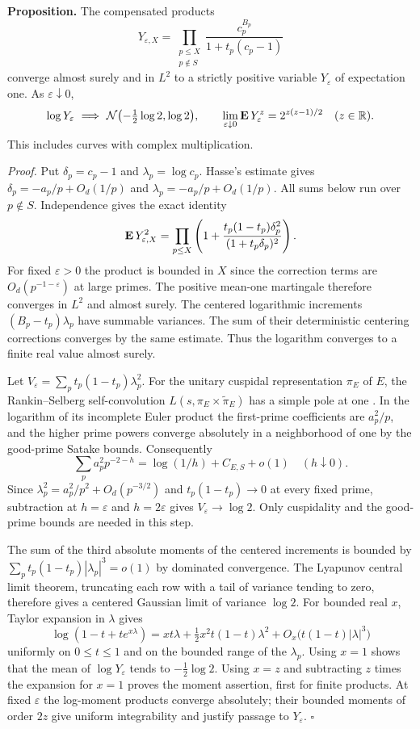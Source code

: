 \documentclass[11pt]{article}
\begin{document}
\medskip\noindent\textbf{Proposition.}
The compensated products
\[
 Y_{\varepsilon,X}=\prod_{\substack{p\le X\\p\notin S}}
 \frac{c_p^{B_p}}{1+t_p(c_p-1)}
\]
converge almost surely and in $L^2$ to a strictly positive variable
$Y_\varepsilon$ of expectation one. As $\varepsilon\downarrow0$,
\[
 \log Y_\varepsilon\ \Longrightarrow\
 \mathcal N\bigl(-\tfrac12\log 2,\log 2\bigr),\qquad
 \lim_{\varepsilon\downarrow0}{\bf E}\,Y_\varepsilon^z
    =2^{z(z-1)/2}\quad(z\in\mathbb R).
\]
This includes curves with complex multiplication.

\medskip\noindent\emph{Proof.}
Put $\delta_p=c_p-1$ and $\lambda_p=\log c_p$.
Hasse's estimate gives $\delta_p=-a_p/p+O_d(1/p)$ and
$\lambda_p=-a_p/p+O_d(1/p)$. All sums below run over $p\notin S$.
Independence gives the exact identity
\[
 {\bf E}\,Y_{\varepsilon,X}^2
 =\prod_{p\le X}\left(1+
 \frac{t_p(1-t_p)\delta_p^2}{(1+t_p\delta_p)^2}\right).
\]
For fixed $\varepsilon>0$ the product is bounded in $X$ since the
correction terms are $O_d(p^{-1-\varepsilon})$ at large primes.
The positive mean-one martingale therefore converges in $L^2$ and
almost surely. The centered logarithmic increments
$(B_p-t_p)\lambda_p$ have summable variances. The sum of their
deterministic centering corrections converges by the same estimate.
Thus the logarithm converges to a finite real value almost surely.

Let $V_\varepsilon=\sum_p t_p(1-t_p)\lambda_p^2$. For the unitary
cuspidal representation $\pi_E$ of $E$, the Rankin--Selberg
self-convolution $L(s,\pi_E\times\widetilde\pi_E)$ has a simple pole
at one \cite{RS}. In the logarithm of its incomplete Euler product
the first-prime coefficients are $a_p^2/p$, and the higher prime
powers converge absolutely in a neighborhood of one by the
good-prime Satake bounds. Consequently
\[
 \sum_p a_p^2p^{-2-h}=\log(1/h)+C_{E,S}+o(1)\quad(h\downarrow0).
\]
Since $\lambda_p^2=a_p^2/p^2+O_d(p^{-3/2})$ and
$t_p(1-t_p)\to0$ at every fixed prime, subtraction at
$h=\varepsilon$ and $h=2\varepsilon$ gives $V_\varepsilon\to\log2$.
Only cuspidality and the good-prime bounds are needed in this step.

The sum of the third absolute moments of the centered increments is
bounded by $\sum_p t_p(1-t_p)|\lambda_p|^3=o(1)$ by dominated
convergence. The Lyapunov central limit theorem, truncating each row
with a tail of variance tending to zero, therefore gives a centered
Gaussian limit of variance $\log2$. For bounded real $x$, Taylor
expansion in $\lambda$ gives
\[
 \log(1-t+te^{x\lambda})
 =xt\lambda+\tfrac12 x^2t(1-t)\lambda^2
       +O_x\bigl(t(1-t)|\lambda|^3\bigr)
\]
uniformly on $0\le t\le1$ and on the bounded range of the
$\lambda_p$. Using $x=1$ shows that the mean of $\log Y_\varepsilon$
tends to $-\tfrac12\log2$. Using $x=z$ and subtracting $z$ times the
expansion for $x=1$ proves the moment assertion, first for finite
products. At fixed $\varepsilon$ the log-moment products converge
absolutely; their bounded moments of order $2z$ give uniform
integrability and justify passage to $Y_\varepsilon$. \hfill$\square$
\end{document}
